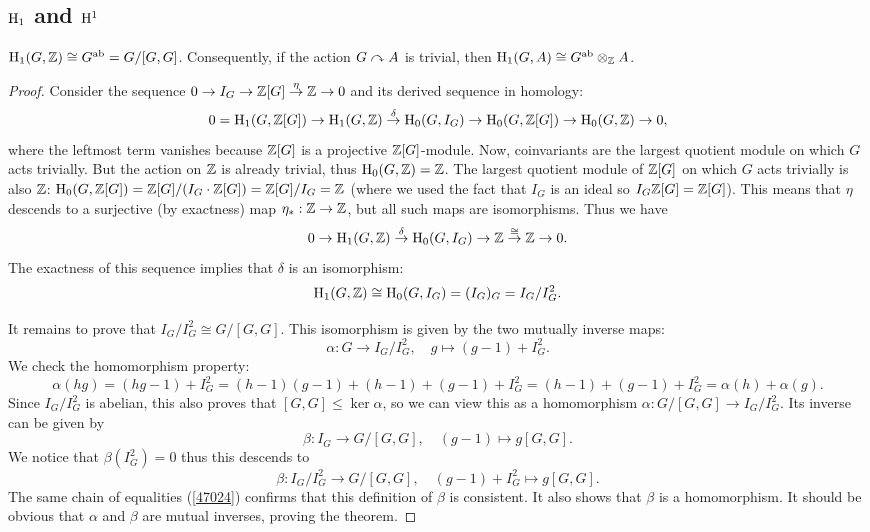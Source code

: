 \subsection{\texorpdfstring{$\mathrm{H}_1$}{H1} and \texorpdfstring{$\mathrm{H}^1$}{H1}}

\begin{thm}
    $\mathrm{H}_1(G,\mathbb{Z})\cong G^{\mathrm{ab}}=G\slash [G,G]$. Consequently, if the action $G\curvearrowright A$ is trivial, then $\mathrm{H}_1(G,A)\cong G^{\mathrm{ab}}\otimes_{\mathbb{Z}} A$.
\end{thm}
\begin{proof}
 Consider the sequence $0\to I_G\to \mathbb{Z}[G]\overset{\eta}{\to}\mathbb{Z}\to 0$ and its derived sequence in homology:
 \[0=\mathrm{H}_1(G,\mathbb{Z}[G])\to \mathrm{H}_1(G,\mathbb{Z})\overset{\delta}{\to}\mathrm{H}_0(G,I_G)\to \mathrm{H}_0(G,\mathbb{Z}[G])\to \mathrm{H}_0(G,\mathbb{Z})\to 0,\]
 where the leftmost term vanishes because $\mathbb{Z}[G]$ is a projective $\mathbb{Z}[G]$-module. Now, coinvariants are the largest quotient module on which $G$ acts trivially. But the action on $\mathbb{Z}$ is already trivial, thus $\mathrm{H}_0(G,\mathbb{Z})=\mathbb{Z}$. The largest quotient module of $\mathbb{Z}[G]$ on which $G$ acts trivially is also $\mathbb{Z}$: $\mathrm{H}_0(G,\mathbb{Z}[G])=\mathbb{Z}[G]\slash (I_G\cdot \mathbb{Z}[G])=\mathbb{Z}[G]\slash I_G=\mathbb{Z}$ (where we used the fact that $I_G$ is an ideal so $I_G\mathbb{Z}[G]=\mathbb{Z}[G]$). This means that $\eta$ descends to a surjective (by exactness) map $\eta_\ast:\mathbb{Z}\to \mathbb{Z}$, but all such maps are isomorphisms. Thus we have
 \[0\to \mathrm{H}_1(G,\mathbb{Z})\overset{\delta}{\to}\mathrm{H}_0(G,I_G)\to \mathbb{Z} \overset{\cong}{\to}\mathbb{Z}\to 0.\]
 The exactness of this sequence implies that $\delta$ is an isomorphism:
 \[\mathrm{H}_1(G,\mathbb{Z})\cong \mathrm{H}_0(G,I_G)=(I_G)_G=I_G\slash I_G^2.\]

 It remains to prove that $I_G\slash I_G^2\cong G\slash[G,G]$. This isomorphism is given by the two mutually inverse maps:
 \[\alpha:G\to I_G\slash I_G^2,\quad g\mapsto (g-1)+I_G^2.\]
 We check the homomorphism property:
 \[\alpha(hg)=(hg-1)+I_G^2=(h-1)(g-1)+(h-1)+(g-1)+I_G^2=(h-1)+(g-1)+I_G^2=\alpha(h)+\alpha(g).\label{47024}\]
 Since $I_G\slash I_G^2$ is abelian, this also proves that $[G,G]\leq \ker\alpha$, so we can view this as a homomorphism $\alpha:G\slash [G,G]\to I_G\slash I_G^2$. Its inverse can be given by
 \[\beta:I_G\to G\slash [G,G],\quad (g-1)\mapsto g[G,G].\]
 We notice that $\beta(I_G^2)=0$ thus this descends to 
\[\beta:I_G\slash I_G^2\to G\slash [G,G],\quad (g-1)+I_G^2\mapsto g[G,G].\]
The same chain of equalities  (\ref{47024}) confirms that this definition of $\beta$ is consistent. It also shows that $\beta$ is a homomorphism. It should be obvious that $\alpha$ and $\beta$ are mutual inverses, proving the theorem.
\end{proof}

